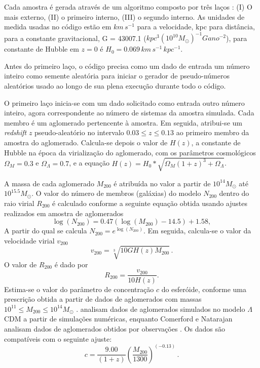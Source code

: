 Cada amostra é gerada através de um algoritmo composto por três laços : (I) O mais externo, (II) o primeiro interno, (III) o segundo interno. As unidades de medida usadas no código estão em $km \, s^{-1}$ para a velocidade, kpc para distância, para a constante gravitacional, G = 43007.1 ($kpc^3 (10^{10} M_{\odot})^{-1} Gano^{-2}$), para constante de Hubble em $z=0$ é $H_0 = 0.069 \, km \, s^{-1} \, kpc^{-1}$.

Antes do primeiro laço, o código precisa como um dado de entrada um número inteiro como semente aleatória para iniciar o gerador de pseudo-números aleatórios usado ao longo de sua plena execução durante todo o código. 

O primeiro laço inicia-se com um dado solicitado como entrada outro número inteiro, agora correspondente ao número de sistemas da amostra simulada. Cada membro é um aglomerado pertencente à amostra. Em seguida, atribui-se um \textit{redshift} $z$ pseudo-aleatório no intervalo $0.03 \leq z \leq 0.13$ ao primeiro membro da amostra do aglomerado. Calcula-se depois o valor de $H(z)$, a constante de Hubble na época da virialização do aglomerado, com os parâmetros cosmológicos $\Omega_M = 0.3$ e $\Omega_{\Lambda}=0.7$, e a equação $H(z) = H_0*\sqrt{\Omega_M(1+z)^3 + \Omega_{\Lambda}}$.

A massa de cada aglomerado $M_{200}$ é atribuída no valor a partir de $10^{14} M_{\odot}$ até $10^{15.5}M_{\odot}$. O valor do número de membros (galáxias) do modelo $N_{200}$ dentro do raio virial $R_{200}$ é calculado conforme a seguinte equação obtida usando ajustes realizados em amostra de aglomerados \cite{andreon2012}
\begin{equation}
\log(N_{200}) = 0.47(\log(M_{200}) - 14.5) + 1.58,
\label{andreon}	
\end{equation}	
A partir do qual se calcula $N_{200} = e^{\log(N_{200})}$. Em seguida, calcula-se o valor da velocidade virial $v_{200}$\cite{springel1999}
\begin{equation}
v_{200} = \sqrt[3]{10GH(z)M_{200}} \, .
\label{velocidadevirial}
\end{equation}	
O valor de $R_{200}$ é dado por 
\begin{equation} R_{200} = \frac{v_{200}}{10H(z)}.
\label{rvirial}
\end{equation}
Estima-se o valor do parâmetro de concentração $c$ do esferóide, conforme uma prescrição obtida a partir de dados de aglomerados com massas $10^{11} \leq M_{200} \leq 10^{14} M_{\odot}$ \cite{Bullock}.  analisam dados de aglomerados simulados no modelo $\Lambda$CDM \cite{Bullock} a partir de simulações numéricas, enquanto Comerford e Natarajan analisam dados de aglomerados obtidos por observa\c c\~oes \cite{COMERFORD}. Os dados são compatíveis com o seguinte ajuste:
\begin{equation}
c = \frac{9.00}{(1+z)} \left(\frac{M_{200}}{1300}\right)^{(-0.13)} \, .	
\label{cparameter}
\end{equation}

